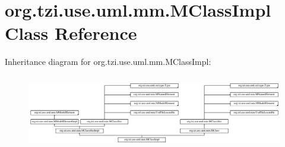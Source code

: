 \hypertarget{classorg_1_1tzi_1_1use_1_1uml_1_1mm_1_1_m_class_impl}{\section{org.\-tzi.\-use.\-uml.\-mm.\-M\-Class\-Impl Class Reference}
\label{classorg_1_1tzi_1_1use_1_1uml_1_1mm_1_1_m_class_impl}
}
Inheritance diagram for org.\-tzi.\-use.\-uml.\-mm.\-M\-Class\-Impl\-:\begin{figure}[H]
\begin{center}
\leavevmode
\includegraphics[height=3.266667cm]{classorg_1_1tzi_1_1use_1_1uml_1_1mm_1_1_m_class_impl}
\end{center}
\end{figure}
